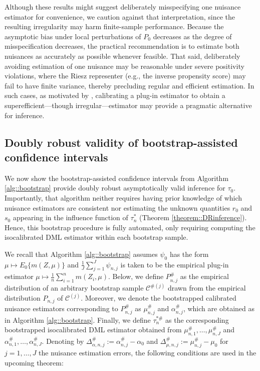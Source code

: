 \documentclass[11pt]{article}
\theoremstyle{plain}
\begin{document}
{\color{purple}Although these results might suggest deliberately misspecifying one nuisance estimator for convenience, we caution against that interpretation, since the resulting irregularity may harm finite-sample performance. Because the asymptotic bias under local perturbations of \(P_0\) decreases as the degree of misspecification decreases, the practical recommendation is to estimate both nuisances as accurately as possible whenever feasible. That said, deliberately avoiding estimation of one nuisance may be reasonable under severe positivity violations, where the Riesz representer (e.g., the inverse propensity score) may fail to have finite variance, thereby precluding regular and efficient estimation. In such cases, as motivated by \cite{benkeser2020nonparametric,van2025automatic}, calibrating a plug-in estimator to obtain a superefficient---though irregular---estimator may provide a pragmatic alternative for inference.}

 
 

 

 

\subsection{ Doubly robust validity of bootstrap-assisted confidence intervals }
\label{section::bootstrap}

We now show the bootstrap-assisted confidence intervals from Algorithm \ref{alg::bootstrap} provide  doubly robust asymptotically valid inference for $\tau_0$. 
Importantly, that algorithm neither requires having prior knowledge of which nuisance estimators are consistent nor estimating the unknown quantities $r_0$ and $s_0$ appearing in the influence function of $\tau_n^*$ (Theorem \ref{theorem::DRinference}). Hence, this bootstrap procedure is fully automated, only requiring computing the isocalibrated DML estimator within each bootstrap sample.  

We recall that Algorithm \ref{alg::bootstrap} assumes $\psi_0$ has the form $\mu \mapsto E_0\{m(Z, \mu)\}$ and $\frac{1}{J}\sum_{j=1}^J\psi_{n,j}$ is taken to be the empirical plug-in estimator $\mu \mapsto \frac{1}{n}\sum_{i=1}^n m(Z_i, \mu)$. Below, we define $P_{n,j}^\#$ as the empirical distribution of an arbitrary bootstrap sample $\mathcal{C}^{\#(j)}$ drawn from the empirical distribution $P_{n,j}$ of $\mathcal{C}^{(j)}$. Moreover, we denote the bootstrapped calibrated nuisance estimators corresponding to $P_{n,j}^\#$ as $\mu_{n,j}^{\#}$ and $\alpha_{n,j}^{\#}$, which are obtained as in Algorithm \ref{alg::bootstrap}. Finally, we define $\tau_n^{*\#}$ as the corresponding bootstrapped isocalibrated DML estimator obtained from $\mu_{n,1}^{\#},\ldots,\mu_{n,J}^{\#}$ and $\alpha_{n,1}^{\#},\ldots,\alpha_{n,J}^{\#}$. Denoting by $\Delta_{\alpha,n,j}^\# := \alpha_{n,j}^\# - \alpha_0$ and $\Delta_{\mu,n,j}^\# := \mu_{n,j}^\# - \mu_0$ for $j=1,\ldots,J$ the nuisance estimation errors, the following conditions are used in the upcoming theorem:
 
\end{document}

